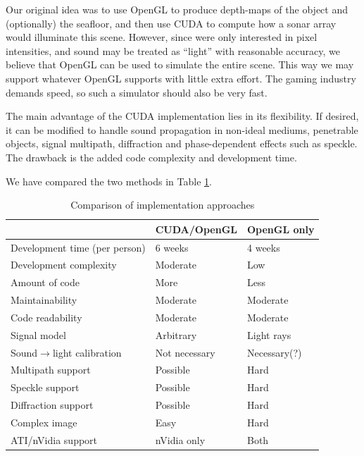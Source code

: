 \documentclass[
   article                                      %
 , 12pt                                         %
 , xelatex                                      %
 , bibtex                                       %
 , layout
]{common/mytemplate}
\begin{document}
Our original idea was to use OpenGL to produce depth-maps of the object and (optionally) the seafloor, and then use CUDA to compute how a sonar array would illuminate this scene. However, since were only interested in pixel intensities, and sound may be treated as ``light'' with reasonable accuracy, we believe that OpenGL can be used to simulate the entire scene. This way we may support whatever OpenGL supports with little extra effort. The gaming industry demands speed, so such a simulator should also be very fast.

The main advantage of the CUDA implementation lies in its flexibility. If desired, it can be modified to handle sound propagation in non-ideal mediums, penetrable objects, signal multipath, diffraction and phase-dependent effects such as speckle. The drawback is the added code complexity and development time.

We have compared the two methods in Table \ref{comparison}.

\begin{table}[t]\centering
\begin{tabular}[c]{l l l}\hline
\rowcolor{tabBlue}                  & CUDA/OpenGL    & OpenGL only \\\hline
Development time (per person)       & 6 weeks        & 4 weeks     \\
Development complexity              & Moderate       & Low \\
Amount of code                      & More           & Less \\
Maintainability                     & Moderate       & Moderate \\
Code readability                    & Moderate       & Moderate \\
Signal model                        & Arbitrary      & Light rays  \\
Sound$\rightarrow$light calibration & Not necessary  & Necessary(?) \\
Multipath support                   & Possible       & Hard \\
Speckle support                     & Possible       & Hard \\
Diffraction support                 & Possible       & Hard \\
Complex image                       & Easy           & Hard \\
ATI/nVidia support                  & nVidia only    & Both \\
\end{tabular}
\vspace{5pt}\caption{Comparison of implementation approaches}\label{comparison}
\end{table}
\end{document}
